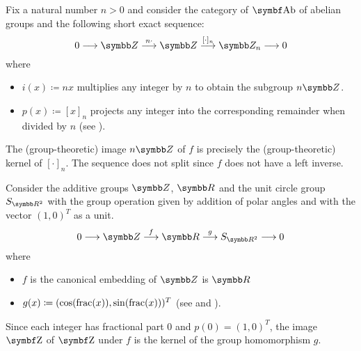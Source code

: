 \begin{example}\label{ex:short_exact_sequences}
  \mbox{}
  \begin{defenum}
     Fix a natural number \( n > 0 \) and consider the category of \( \Cat{Ab} \) of abelian groups and the following short exact sequence:
    \begin{equation*}
      0
      \longrightarrow
      \BZ
      \overset {n \cdot} \longrightarrow
      \BZ
      \overset {\lbrack \cdot \rbrack_n} \longrightarrow
      \BZ_n
      \longrightarrow
      0
    \end{equation*}
    where
    \begin{itemize}
      \item \( i(x) \coloneqq nx \) multiplies any integer by \( n \) to obtain the subgroup \( n \BZ \).
      \item \( p(x) \coloneqq [x]_n \) projects any integer into the corresponding remainder when divided by \( n \) (see ).
    \end{itemize}

    The (group-theoretic) image \( n \BZ \) of \( f \) is precisely the (group-theoretic) kernel of \( [\cdot]_n \). The sequence does not split since \( f \) does not have a left inverse.

     Consider the additive groups \( \BZ \), \( \BR \) and the unit circle group \( S_{\BR^2} \) with the group operation given by addition of polar angles and with the vector \( (1, 0)^T \) as a unit.
    \begin{equation*}
      0
      \longrightarrow
      \BZ
      \overset f \longrightarrow
      \BR
      \overset g \longrightarrow
      S_{\BR^2}
      \longrightarrow
      0
    \end{equation*}
    where
    \begin{itemize}
      \item \( f \) is the canonical embedding of \( \BZ \) is \( \BR \)
      \item \( g(x) \coloneqq (\cos(\operatorname{frac}(x)), \sin(\operatorname{frac}(x)))^T \) (see  and ).
    \end{itemize}

    Since each integer has fractional part \( 0 \) and \( p(0) = (1, 0)^T \), the image \( \Cat{Z} \) of \( \Cat{Z} \) under \( f \) is the kernel of the group homomorphism \( g \).


\end{defenum}
\end{example}
